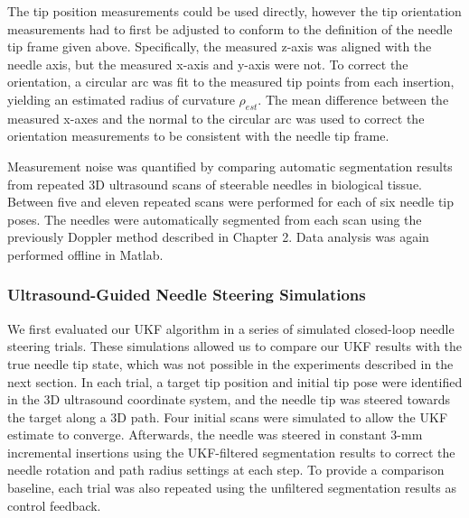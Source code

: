 The tip position measurements could be used directly, however the tip orientation measurements had to first be adjusted to conform to the definition of the needle tip frame given above. Specifically, the measured z-axis was aligned with the needle axis, but the measured x-axis and y-axis were not. To correct the orientation, a circular arc was fit to the measured tip points from each insertion, yielding an estimated radius of curvature $\rho_{est}$. The mean difference between the measured x-axes and the normal to the circular arc was used to correct the orientation measurements to be consistent with the needle tip frame.

Measurement noise was quantified by comparing automatic segmentation results from repeated 3D ultrasound scans of steerable needles in biological tissue. Between five and eleven repeated scans were performed for each of six needle tip poses. The needles were automatically segmented from each scan using the previously Doppler method described in Chapter 2. Data analysis was again performed offline in Matlab.

\subsubsection{Ultrasound-Guided Needle Steering Simulations}
We first evaluated our UKF algorithm in a series of simulated closed-loop needle steering trials. These simulations allowed us to compare our UKF results with the true needle tip state, which was not possible in the experiments described in the next section. In each trial, a target tip position and initial tip pose were identified in the 3D ultrasound coordinate system, and the needle tip was steered towards the target along a 3D path. Four initial scans were simulated to allow the UKF estimate to converge. Afterwards, the needle was steered in constant 3-mm incremental insertions using the UKF-filtered segmentation results to correct the needle rotation and path radius settings at each step. To provide a comparison baseline, each trial was also repeated using the unfiltered segmentation results as control feedback. 

